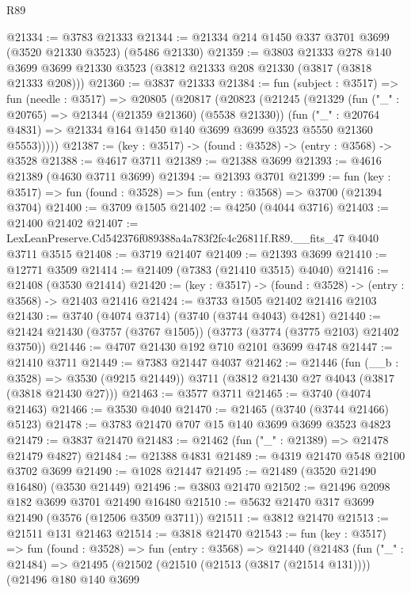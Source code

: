 \begin{lexlean}{R89}
\begin{coremodule}
@21334 := @3783 @21333
@21344 := @21334 @214 @1450 @337 @3701 @3699 (@3520 @21330 @3523) (@5486 @21330)
@21359 := @3803
    @21333
    @278
    @140
    @3699
    @3699
    @21330
    @3523
    (@3812 @21333 @208 @21330 (@3817 (@3818 @21333 @208)))
@21360 := @3837 @21333
@21384 := fun (subject : @3517) =>
  fun (needle : @3517) =>
  @20805
    (@20817
      (@20823
        (@21245
          (@21329
            (fun ("_" : @20765) => @21344 (@21359 @21360) (@5538 @21330))
            (fun ("_" : @20764 @4831) =>
            @21334 @164 @1450 @140 @3699 @3699 @3523 @5550 @21360 @5553)))))
@21387 := (key : @3517) -> (found : @3528) -> (entry : @3568) -> @3528
@21388 := @4617 @3711
@21389 := @21388 @3699
@21393 := @4616 @21389 (@4630 @3711 @3699)
@21394 := @21393 @3701
@21399 := fun (key : @3517) => fun (found : @3528) => fun (entry : @3568) => @3700 (@21394 @3704)
@21400 := @3709 @1505
@21402 := @4250 (@4044 @3716)
@21403 := @21400 @21402
@21407 := LexLeanPreserve.Cd542376f089388a4a783f2fc4c26811f.R89.__fits_47 @4040 @3711 @3515
@21408 := @3719 @21407
@21409 := @21393 @3699
@21410 := @12771 @3509
@21414 := @21409 (@7383 (@21410 @3515) @4040)
@21416 := @21408 (@3530 @21414)
@21420 := (key : @3517) -> (found : @3528) -> (entry : @3568) -> @21403 @21416
@21424 := @3733 @1505 @21402 @21416 @2103
@21430 := @3740 (@4074 @3714) (@3740 (@3744 @4043) @4281)
@21440 := @21424 @21430 (@3757 (@3767 @1505)) (@3773 (@3774 (@3775 @2103) @21402 @3750))
@21446 := @4707 @21430 @192 @710 @2101 @3699 @4748
@21447 := @21410 @3711
@21449 := @7383 @21447 @4037
@21462 := @21446
    (fun (__b : @3528) => @3530 (@9215 @21449))
    @3711
    (@3812 @21430 @27 @4043 (@3817 (@3818 @21430 @27)))
@21463 := @3577 @3711
@21465 := @3740 (@4074 @21463)
@21466 := @3530 @4040
@21470 := @21465 (@3740 (@3744 @21466) @5123)
@21478 := @3783 @21470 @707 @15 @140 @3699 @3699 @3523 @4823
@21479 := @3837 @21470
@21483 := @21462 (fun ("_" : @21389) => @21478 @21479 @4827)
@21484 := @21388 @4831
@21489 := @4319 @21470 @548 @2100 @3702 @3699
@21490 := @1028 @21447
@21495 := @21489 (@3520 @21490 @16480) (@3530 @21449)
@21496 := @3803 @21470
@21502 := @21496 @2098 @182 @3699 @3701 @21490 @16480
@21510 := @5632 @21470 @317 @3699 @21490 (@3576 (@12506 @3509 @3711))
@21511 := @3812 @21470
@21513 := @21511 @131 @21463
@21514 := @3818 @21470
@21543 := fun (key : @3517) =>
  fun (found : @3528) =>
  fun (entry : @3568) =>
  @21440
    (@21483
      (fun ("_" : @21484) =>
      @21495
        (@21502
          (@21510 (@21513 (@3817 (@21514 @131))))
          (@21496
            @180
            @140
            @3699

\end{coremodule}
\end{lexlean}
